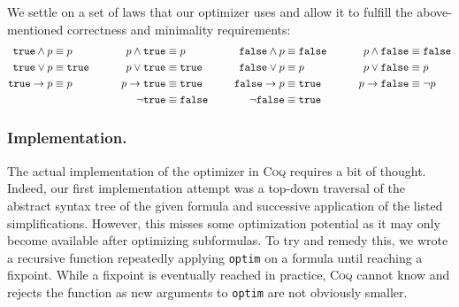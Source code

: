 We settle on a set of laws that our optimizer uses and allow it to fulfill the above-mentioned correctness and minimality requirements:
\begin{alignat}{4}
    \texttt{true} \land p &\equiv p &p \land \texttt{true} &\equiv p &\texttt{false} \land p &\equiv \texttt{false}\hspace*{20pt}&p \land \texttt{false} &\equiv \texttt{false} \\
    \texttt{true} \lor p &\equiv \texttt{true}\hspace*{20pt}&p \lor \texttt{true} &\equiv \texttt{true}\hspace*{20pt}&\texttt{false} \lor p &\equiv p &p \lor \texttt{false} &\equiv p \\
    \texttt{true} \rightarrow p &\equiv p &p \rightarrow \texttt{true} &\equiv \texttt{true} &\texttt{false} \rightarrow p &\equiv \texttt{true} &p \rightarrow \texttt{false} &\equiv \neg p \\
    &&\neg \texttt{true} &\equiv \texttt{false} &\neg \texttt{false} &\equiv \texttt{true}
\end{alignat}

\subsubsection{Implementation.}

The actual implementation of the optimizer in \textsc{Coq} requires a bit of thought.
Indeed, our first implementation attempt was a top-down traversal of the abstract syntax tree of the given formula and successive application of the listed simplifications.
However, this misses some optimization potential as it may only become available after optimizing subformulas.
To try and remedy this, we wrote a recursive function repeatedly applying \texttt{optim} on a formula until reaching a fixpoint.
While a fixpoint is eventually reached in practice, \textsc{Coq} cannot know and rejects the function as new arguments to \texttt{optim} are not obviously smaller.

